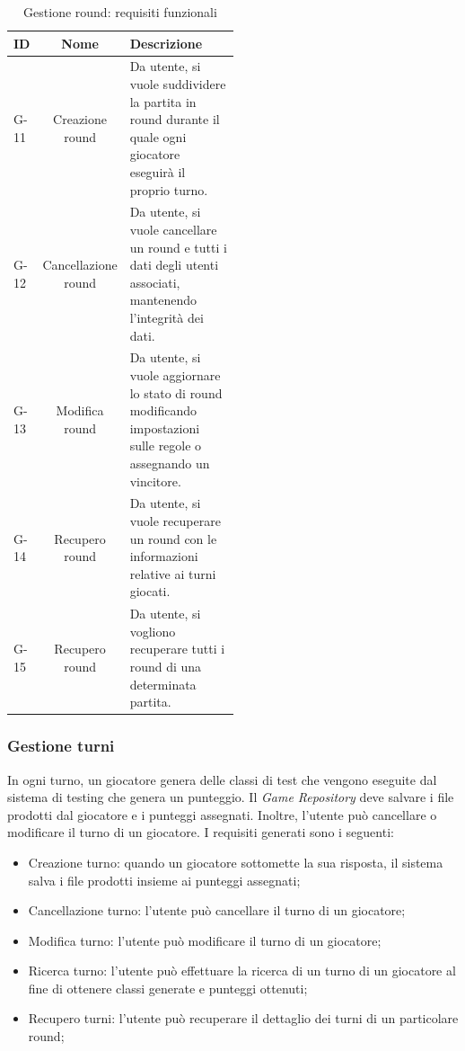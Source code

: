 \documentclass{article}
\begin{document}
\begin{table}[H]
  \center
  \begin{tabular}{|l|c|p{0.5\linewidth}|}
    \hline
    ID & Nome & Descrizione \\
    \hline
        G-11 & Creazione round  & Da utente, si vuole suddividere la partita in round durante il quale ogni giocatore eseguirà il proprio turno. \\
        \hline
        G-12 & Cancellazione round & Da utente, si vuole cancellare un round e tutti i dati degli utenti associati, mantenendo l'integrità dei dati. \\
        \hline
        G-13 & Modifica round  & Da utente, si vuole aggiornare lo stato di round modificando impostazioni sulle regole o assegnando un vincitore. \\
        \hline
        G-14 & Recupero round  & Da utente, si vuole recuperare un round con le informazioni relative ai turni giocati. \\
        \hline
        G-15 & Recupero round  & Da utente, si vogliono recuperare tutti i round di una determinata partita. \\
    \hline
  \end{tabular}
  \caption{Gestione round: requisiti funzionali}
  \label{tab:1x_functional_requirements}
\end{table}


\subsubsection{Gestione turni}
In ogni turno, un giocatore genera delle classi di test che vengono eseguite dal sistema di testing che genera un punteggio. Il \textit{Game Repository} deve salvare i file prodotti dal giocatore e i punteggi assegnati. Inoltre, l'utente può cancellare o modificare il turno di un giocatore. I requisiti generati sono i seguenti:
\begin{itemize}
    \item Creazione turno: quando un giocatore sottomette la sua risposta, il sistema salva i file prodotti insieme ai punteggi assegnati;
    \item Cancellazione turno: l'utente può cancellare il turno di un giocatore;
    \item Modifica turno: l'utente può modificare il turno di un giocatore;
    \item Ricerca turno: l'utente può effettuare la ricerca di un turno di un giocatore al fine di ottenere classi generate e punteggi ottenuti;
    \item Recupero turni: l'utente può recuperare il dettaglio dei turni di un particolare round;
\end{itemize}
\end{document}

